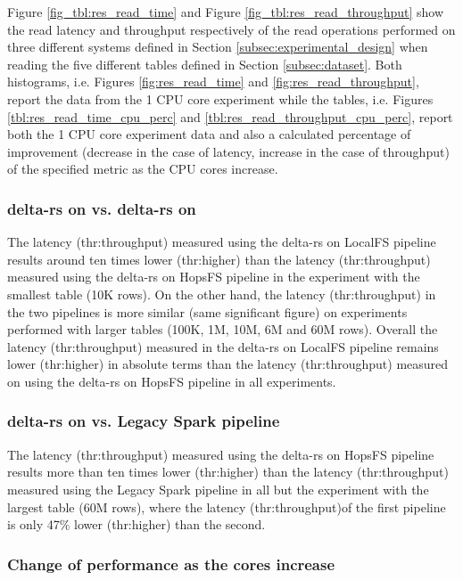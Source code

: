 Figure \ref{fig_tbl:res_read_time} and Figure \ref{fig_tbl:res_read_throughput} show the read latency and throughput respectively of the read operations performed on three different systems defined in Section \ref{subsec:experimental_design} when reading the five different tables defined in Section \ref{subsec:dataset}. Both histograms, i.e. Figures \ref{fig:res_read_time} and \ref{fig:res_read_throughput}, report the data from the 1 \gls{CPU} core experiment while the tables, i.e. Figures \ref{tbl:res_read_time_cpu_perc} and \ref{tbl:res_read_throughput_cpu_perc}, report both the 1 \gls{CPU} core experiment data and also a calculated percentage of improvement (decrease in the case of latency, increase in the case of throughput) of the specified metric as the \gls{CPU} cores increase.

\subsubsection*{delta-rs on  vs. delta-rs on }

The latency (thr:throughput) measured using the delta-rs on \gls{LocalFS} pipeline results around ten times lower (thr:higher) than the latency (thr:throughput) measured using the delta-rs on \gls{HopsFS} pipeline in the experiment with the smallest table (10K rows). On the other hand, the latency (thr:throughput) in the two pipelines is more similar (same significant figure) on experiments performed with larger tables (100K, 1M, 10M, 6M and 60M rows). Overall the latency (thr:throughput) measured in the delta-rs on \gls{LocalFS} pipeline remains lower (thr:higher) in absolute terms than the latency (thr:throughput) measured on using the delta-rs on \gls{HopsFS} pipeline in all experiments.

\subsubsection*{delta-rs on  vs. Legacy Spark pipeline}

The latency (thr:throughput) measured using the delta-rs on \gls{HopsFS} pipeline results more than ten times lower (thr:higher) than the latency (thr:throughput) measured using the Legacy Spark pipeline in all but the experiment with the largest table (60M rows), where the latency (thr:throughput)of the first pipeline is only 47\% lower (thr:higher) than the second. 

\subsubsection*{Change of performance as the  cores increase}

